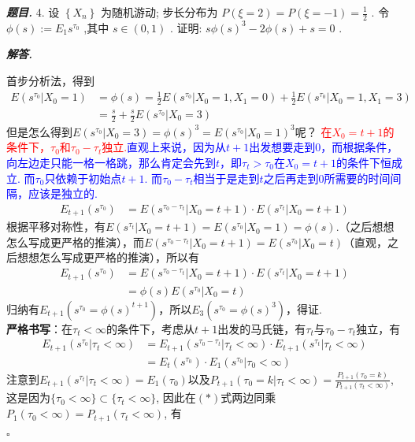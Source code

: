 \documentclass[10pt, a4paper, oneside]{ctexart}
\newenvironment{problem}{\begin{framed}\par\noindent\textbf{\textit{题目. }}}{\end{framed}\par}
\newenvironment{solution}{%
  \par\noindent\textbf{\textit{解答. }}\ignorespaces
}{%
  \hfill\ensuremath{\square}\par %
}
\begin{document}
\begin{problem}
    4. 设 \( \left\{  {X}_{n}\right\}   \) 为随机游动; 步长分布为 \( P\left( {\xi  = 2}\right)  = P\left( {\xi  =  - 1}\right)  = \frac{1}{2} \) . 令 \( \phi \left( s\right)  \mathrel{\text{:=}} {E}_{1}{s}^{{\tau }_{0}} \) ,其中 \( s \in  \left( {0,1}\right)  \) . 证明: \( {s\phi }{\left( s\right) }^{3} - {2\phi }\left( s\right)  + s = 0 \) .
\end{problem}
\begin{solution}
    首步分析法，得到 
    \begin{align*}
        E(s^{\tau_0}|X_0=1)&=\phi(s)=\frac{1}{2}E(s^{\tau_0}|X_0=1,X_1=0)+\frac{1}{2}E(s^{\tau_0}|X_0=1,X_1=3)\\
        &=\frac{s}{2}+\frac{s}{2}E(s^{\tau_0}|X_0=3)
    \end{align*}
    但是怎么得到$E(s^{\tau_0}|X_0=3)=\phi(s)^3=E(s^{\tau_0}|X_0=1)^3$呢？
    \textcolor{red}{在$X_0=t+1$的条件下，$\tau_{0}$和$\tau_{0}-\tau_{t}$独立.}\textcolor{blue}{直观上来说，因为从$t+1$出发想要走到$0$，而根据条件，向左边走只能一格一格跳，那么肯定会先到$t$，即$\tau_t>\tau_0$在$X_0=t+1$的条件下恒成立. 而$\tau_0$只依赖于初始点$t+1$. 而$\tau_0-\tau_t$相当于是走到$t$之后再走到$0$所需要的时间间隔，应该是独立的.}
    \begin{align*}
        E_{t+1}(s^{\tau_0})&=E(s^{\tau_0-\tau_t}|X_0=t+1)\cdot E(s^{\tau_t}|X_0=t+1)
    \end{align*}
    根据平移对称性，有$E(s^{\tau_t}|X_0=t+1)=E(s^{\tau_0}|X_0=1)=\phi(s)$.（之后想想怎么写成更严格的推演），而$E(s^{\tau_0-\tau_t}|X_0=t+1)=E(s^{\tau_0}|X_0=t)$（直观，之后想想怎么写成更严格的推演），所以有
    \begin{align*}
        E_{t+1}(s^{\tau_0})&=E(s^{\tau_0-\tau_t}|X_0=t+1)\cdot E(s^{\tau_t}|X_0=t+1)\\
        &=\phi(s)E(s^{\tau_0}|X_0=t)
    \end{align*}
    归纳有$E_{t+1}(s^{\tau_0}=\phi(s)^{t+1})$，所以$E_{3}(s^{\tau_0}=\phi(s)^{3})$，得证.\\
    \textbf{严格书写}：在$\tau_t<\infty$的条件下，考虑从$t+1$出发的马氏链，有$\tau_t$与$\tau_{0}-\tau_{t}$独立，有
    \begin{align*}
        E_{t+1}(s^{\tau_0}| \tau_t<\infty )&=E_{t+1}(s^{\tau_0-\tau_{t}}| \tau_t<\infty )\cdot E_{t+1}(s^{\tau_{t}}| \tau_t<\infty )\\
        &=E_t(s^{\tau_0})\cdot E_1(s^{\tau_0}|\tau_0<\infty)\tag{*}
    \end{align*}
    注意到$E_{t+1}(s^{\tau_t}|\tau_t<\infty)=E_1(\tau_0)$以及$P_{t+1}(\tau_0=k|\tau_t<\infty)=\frac{P_{t+1}(\tau_0=k)}{P_{t+1}(\tau_t<\infty)}$, 这是因为$\{\tau_0<\infty\}\subset \{\tau_t<\infty\}$, 因此在$(*)$式两边同乘$P_1(\tau_0<\infty)=P_{t+1}(\tau_t<\infty)$, 有 

\end{solution}
\end{document}
